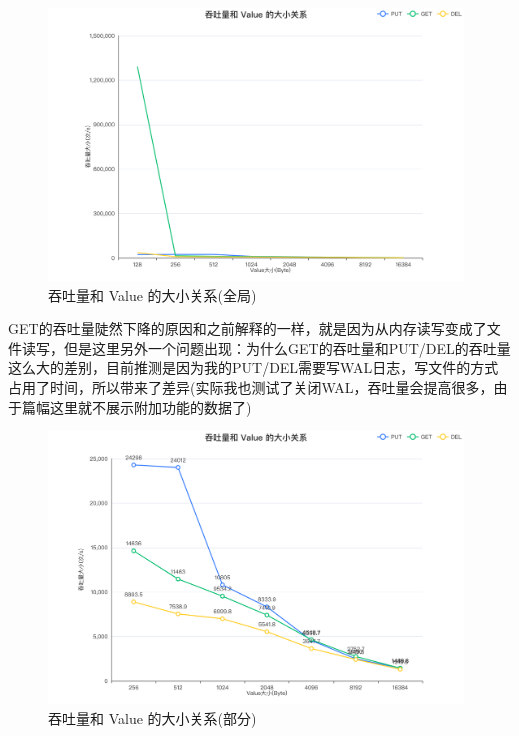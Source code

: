 \documentclass[fontset=windows]{article}
\begin{document}
\begin{figure}[h!]
  \centering
  \includegraphics[width=0.98\textwidth]{Image/吞吐量和 Value 的大小关系 (全局).png}
  \caption{吞吐量和 Value 的大小关系(全局)}
  \label{fig:吞吐量和 Value 的大小关系(全局)}
\end{figure}

GET的吞吐量陡然下降的原因和之前解释的一样，就是因为从内存读写变成了文件读写，但是这里另外一个问题出现：为什么GET的吞吐量和PUT/DEL的吞吐量这么大的差别，目前推测是因为我的PUT/DEL需要写WAL日志，写文件的方式占用了时间，所以带来了差异(实际我也测试了关闭WAL，吞吐量会提高很多，由于篇幅这里就不展示附加功能的数据了)

\begin{figure}[h!]
  \centering
  \includegraphics[width=0.98\textwidth]{Image/吞吐量和 Value 的大小关系 (部分).png}
  \caption{吞吐量和 Value 的大小关系(部分)}
  \label{fig:吞吐量和 Value 的大小关系(部分)}
\end{figure}
\end{document}
